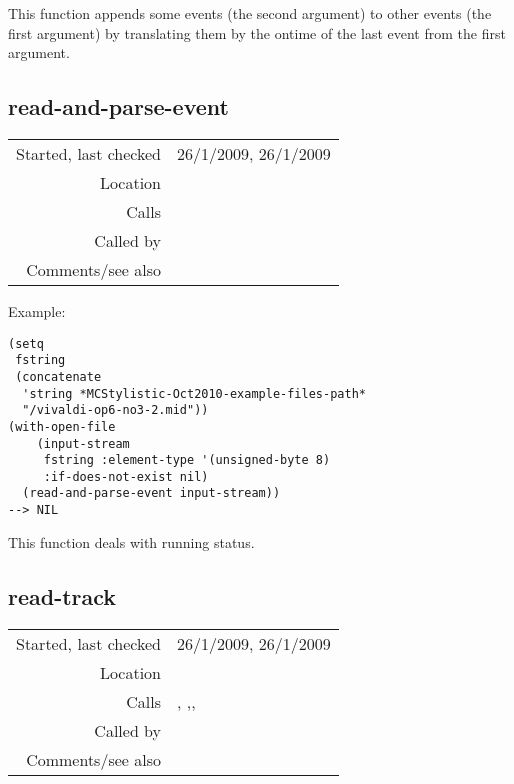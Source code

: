 \noindent This function appends some events (the
second argument) to other events (the first argument)
by translating them by the ontime of the last event
from the first argument.


\subsection*{read-and-parse-event}\label{fun:read-and-parse-event}

\vspace{0.3cm}
\begin{tabular}{r|p{8cm}}
Started, last checked & 26/1/2009, 26/1/2009 \\
Location & \nameref{sec:MIDI-import} \\
Calls & \nameref{fun:parse-events} \\
Called by & \nameref{fun:read-track} \\
Comments/see also &
\end{tabular}

\vspace{0.5cm}
\noindent Example:
\begin{verbatim}
(setq
 fstring
 (concatenate
  'string *MCStylistic-Oct2010-example-files-path*
  "/vivaldi-op6-no3-2.mid"))
(with-open-file
    (input-stream
     fstring :element-type '(unsigned-byte 8)
     :if-does-not-exist nil)
  (read-and-parse-event input-stream))
--> NIL
\end{verbatim}

\noindent This function deals with running status.


\subsection*{read-track}\label{fun:read-track}

\vspace{0.3cm}
\begin{tabular}{r|p{8cm}}
Started, last checked & 26/1/2009, 26/1/2009 \\
Location & \nameref{sec:MIDI-import} \\
Calls & \nameref{fun:gather-bytes}, \nameref{fun:get-track-header},\newline \nameref{fun:read-and-parse-event}, \nameref{fun:set-track-time} \\
Called by & \nameref{fun:load-midi-file} \\
Comments/see also &
\end{tabular}

